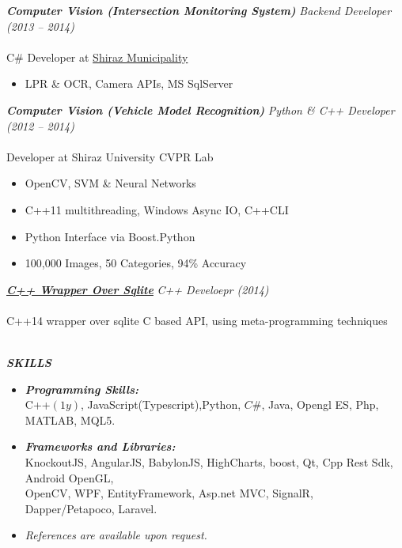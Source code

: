 \documentclass{article}
\newcommand{\hh}[1]{\large{\textit{\textbf{#1}}}}
\newcommand{\hhh}[1]{\Large{\textit{\textbf{#1}}}}
\newcommand{\h}[1]{\normalsize{\textit{\textbf{#1}}}}
\renewcommand{\i}[1]{\normalsize{\textit{#1}}}
\begin{document}
\hh{Computer Vision (Intersection Monitoring System)} \hfill \i{Backend Developer (2013 -- 2014)} \\ \vspace{-.35cm} \\
C\# Developer at \href{https://portal.shiraz.ir/}{Shiraz Municipality} \\ \vspace {-.90cm}
\begin{itemize}
 \setlength{\itemsep}{1pt} \setlength{\parskip}{0pt} \setlength{\parsep}{0pt}
 \item LPR \& OCR, Camera APIs, MS SqlServer
\end{itemize}

\hh{Computer Vision (Vehicle Model Recognition)} \hfill \i{Python \& C++ Developer (2012 -- 2014)} \\ \vspace{-.35cm} \\
Developer at Shiraz University CVPR Lab \\ \vspace{-.9cm}
\begin{itemize}
 \setlength{\itemsep}{1pt} \setlength{\parskip}{0pt} \setlength{\parsep}{0pt}
 \item OpenCV, SVM \& Neural Networks
 \item C++11 multithreading, Windows Async IO, C++\/CLI
 \item Python Interface via Boost.Python
 \item 100,000 Images, 50 Categories, 94\% Accuracy
\end{itemize}

\hh{\href{https://github.com/aminroosta/sqlite_modern_cpp}{C++ Wrapper Over Sqlite}}
\hfill \i{C++ Develoepr (2014)} \\ \vspace {-.35cm} \\
C++14 wrapper over sqlite C based API, using meta-programming techniques \\ \vspace{-.35cm} \\

\vspace{.1cm}
 \centerline{\hhh{SKILLS}}
\vspace{-.6cm}
\begin{itemize}
 \setlength{\itemsep}{3pt} \setlength{\parskip}{0pt} \setlength{\parsep}{0pt}
 \item \h{Programming Skills:} \\
 C++$(1y)$, JavaScript(Typescript),Python, $C\#$, Java, Opengl ES,  Php, MATLAB, MQL5.
 \item \h{Frameworks and Libraries:} \\
 KnockoutJS, AngularJS, BabylonJS, HighCharts, boost, Qt, Cpp Rest Sdk, Android OpenGL, \\
 OpenCV, WPF, EntityFramework, Asp.net MVC, SignalR, Dapper/Petapoco, Laravel.
\end{itemize}

\begin{itemize}
 \item \textit{References are available upon request.}
\end{itemize}
\end{document}
